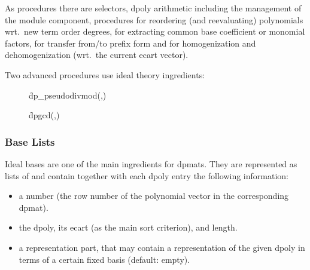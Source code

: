 As procedures there are selectors, dpoly arithmetic including the management
of the module component, procedures for reordering (and reevaluating)
polynomials wrt.\ new term order degrees, for extracting common base
coefficient or monomial factors, for transfer from/to prefix form and for
homogenization and dehomogenization (wrt.\ the current ecart vector).

Two advanced procedures use ideal theory ingredients:
\begin{description}
\item[]
  \begin{syntax}
    \f{dp\_pseudodivmod}(,)
  \end{syntax}
  \hypertarget{procedure:DP_PSEUDODIVMOD}{}

\item[]
  \begin{syntax}
    \f{dpgcd}(,)
  \end{syntax}
  \hypertarget{procedure:DPGCD}{}
\end{description}


\subsubsection{Base Lists}

Ideal bases are one of the main ingredients for dpmats. They are
represented as lists of  and contain together with
each dpoly entry the following information:
\begin{itemize}
\item a number (the row number of the polynomial vector in the
corresponding dpmat).

\item the dpoly, its ecart (as the main sort criterion), and length.

\item a representation part, that may contain a representation of the
given dpoly in terms of a certain fixed basis (default: empty).
\end{itemize}

